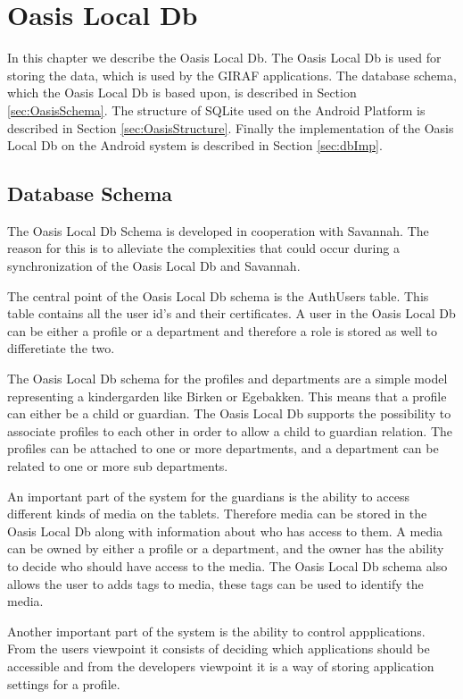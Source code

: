 \chapter{Oasis Local Db}
\label{ch:Db}
In this chapter we describe the Oasis Local Db.
The Oasis Local Db is used for storing the data, which is used by the GIRAF applications.
The database schema, which the Oasis Local Db is based upon, is described in Section \vref{sec:OasisSchema}.
The structure of SQLite used on the Android Platform is described in Section \vref{sec:OasisStructure}.
Finally the implementation of the Oasis Local Db on the Android system is described in Section \vref{sec:dbImp}.

\section{Database Schema}
\label{sec:OasisSchema}
The Oasis Local Db Schema is developed in cooperation with Savannah.
The reason for this is to alleviate the complexities that could occur during a synchronization of the Oasis Local Db and Savannah.

The central point of the Oasis Local Db schema is the AuthUsers table.
This table contains all the user id's and their certificates.
A user in the Oasis Local Db can be either a profile or a department and therefore a role is stored as well to differetiate the two.

The Oasis Local Db schema for the profiles and departments are a simple model representing a kindergarden like Birken or Egebakken.
This means that a profile can either be a child or guardian.
The Oasis Local Db supports the possibility to associate profiles to each other in order to allow a child to guardian relation.
The profiles can be attached to one or more departments, and a department can be related to one or more sub departments.

An important part of the system for the guardians is the ability to access different kinds of media on the tablets.
Therefore media can be stored in the Oasis Local Db along with information about who has access to them.
A media can be owned by either a profile or a department, and the owner has the ability to decide who should have access to the media.
The Oasis Local Db schema also allows the user to adds tags to media, these tags can be used to identify the media.

Another important part of the system is the ability to control appplications.
From the users viewpoint it consists of deciding which applications should be accessible and from the developers viewpoint it is a way of storing application settings for a profile.


